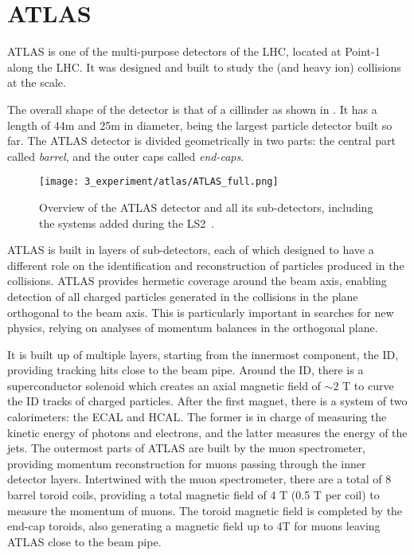 \FloatBarrier
\section{ATLAS}
\label{sec:atlas:atlas}

\ac{ATLAS} is one of the multi-purpose detectors of the \ac{LHC}, located at Point-1 along the \ac{LHC}. It was designed and built to study the \pp (and heavy ion) collisions at the \tev scale.

The overall shape of the detector is that of a cillinder as shown in \Fig{\ref{fig:atlas:atlas:atlas}}. It has a length of 44m and 25m in diameter, being the largest particle detector built so far. The \ac{ATLAS} detector is divided geometrically in two parts: the central part called \textit{barrel}, and the outer caps called \textit{end-caps}.

\begin{figure}[ht!]
    \centering
    \texttt{[image: 3\_experiment/atlas/ATLAS\_full.png]}
    \caption{Overview of the \ac{ATLAS} detector and all its sub-detectors, including the systems added during the \ac{LS2}~\cite{ATLASDiagram}.}
    \label{fig:atlas:atlas:atlas}
\end{figure}

\ac{ATLAS} is built in layers of sub-detectors, each of which designed to have a different role on the identification and reconstruction of particles produced in the collisions. \ac{ATLAS} provides hermetic coverage around the beam axis, enabling detection of all charged particles generated in the collisions in the plane orthogonal to the beam axis. This is particularly important in searches for new physics, relying on analyses of momentum balances in the orthogonal plane.

It is built up of multiple layers, starting from the innermost component, the \acf{ID}, providing tracking hits close to the beam pipe. Around the \ac{ID}, there is a superconductor solenoid which creates an axial magnetic field of \(\sim 2\) T to curve the \ac{ID} tracks of charged particles.
After the first magnet, there is a system of two calorimeters: the \ac{ECAL} and \ac{HCAL}. The former is in charge of measuring the kinetic energy of photons and electrons, and the latter measures the energy of the jets.
The outermost parts of \ac{ATLAS} are built by the muon spectrometer, providing momentum reconstruction for muons passing through the inner detector layers. Intertwined with the muon spectrometer, there are a total of 8 barrel toroid coils, providing a total magnetic field of 4 T (0.5 T per coil) to measure the momentum of muons. The toroid magnetic field is completed by the end-cap toroids,  also generating a magnetic field up to 4T for muons leaving \ac{ATLAS} close to the beam pipe.

